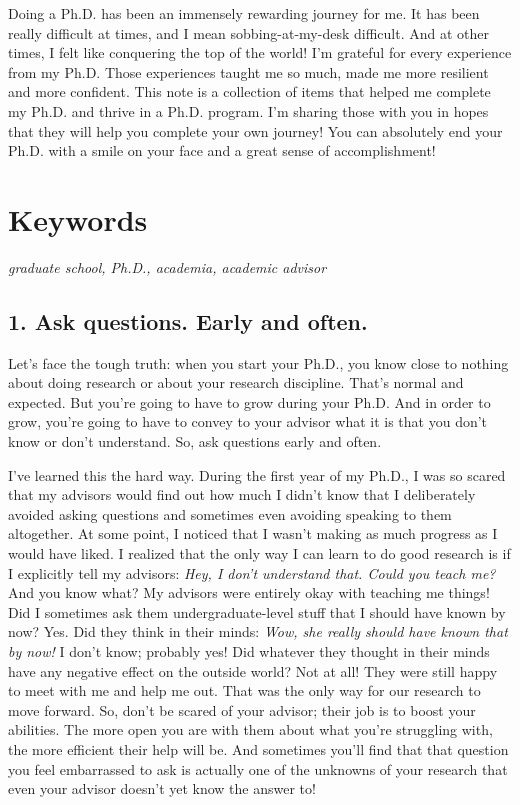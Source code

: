 \documentclass[10pt,twocolumn]{article}
\begin{document}
\small

Doing a Ph.D. has been an immensely rewarding journey for me. It has been really difficult at times, and I mean sobbing-at-my-desk difficult. And at other times, I felt like conquering the top of the world! I’m grateful for every experience from my Ph.D. Those experiences taught me so much, made me more resilient and more confident. This note is a collection of items that helped me complete my Ph.D. and thrive in a Ph.D. program. I’m sharing those with you in hopes that they will help you complete your own journey! You can absolutely end your Ph.D. with a smile on your face and a great sense of accomplishment!

\section*{Keywords}

\textit{graduate school, Ph.D., academia, academic advisor}

\subsection*{1. Ask questions. Early and often.}

Let’s face the tough truth: when you start your Ph.D., you know close to nothing about doing research or about your research discipline. That’s normal and expected. But you’re going to have to grow during your Ph.D. And in order to grow, you’re going to have to convey to your advisor what it is that you don’t know or don’t understand. So, ask questions early and often.

I’ve learned this the hard way. During the first year of my Ph.D., I was so scared that my advisors would find out how much I didn’t know that I deliberately avoided asking questions and sometimes even avoiding speaking to them altogether. At some point, I noticed that I wasn't making as much progress as I would have liked. I realized that the only way I can learn to do good research is if I explicitly tell my advisors: \textit{Hey, I don’t understand that. Could you teach me?} And you know what? My advisors were entirely okay with teaching me things! Did I sometimes ask them undergraduate-level stuff that I should have known by now? Yes. Did they think in their minds: \textit{Wow, she really should have known that by now!} I don’t know; probably yes! Did whatever they thought in their minds have any negative effect on the outside world? Not at all! They were still happy to meet with me and help me out. That was the only way for our research to move forward. So, don’t be scared of your advisor; their job is to boost your abilities. The more open you are with them about what you’re struggling with, the more efficient their help will be. And sometimes you’ll find that that question you feel embarrassed to ask is actually one of the unknowns of your research that even your advisor doesn’t yet know the answer to!
\end{document}
